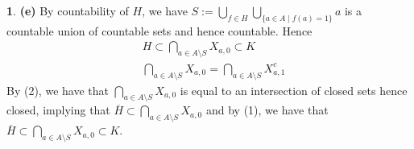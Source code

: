 \documentclass[10.5pt]{article}
\theoremstyle{definition}
\newtheorem{pb}{}
\newcommand{\set}[1]{\{#1\}}
\begin{document}
\begin{pb}
        \textbf{(e)} By countability of \(H\), we have \(S := \bigcup_{f \in H}\bigcup_{\set{a \in A\mid f(a) = 1}} a\) is a countable union of countable sets and hence countable. Hence 
        \begin{align}
            &H \subset \bigcap_{a \in A \setminus S} X_{a,0} \subset K \\
            &\bigcap_{a \in A \setminus S} X_{a,0} = \bigcap_{a \in A \setminus S} X_{a,1}^c
        \end{align}
        By (2), we have that \(\bigcap_{a \in A \setminus S} X_{a,0}\) is equal to an intersection of closed sets hence closed, implying that \(\overline{H} \subset \bigcap_{a \in A \setminus S} X_{a,0}\) and by (1), we have that \(\overline{H} \subset \bigcap_{a \in A \setminus S} X_{a,0} \subset K\).
    \end{pb}
\end{document}

